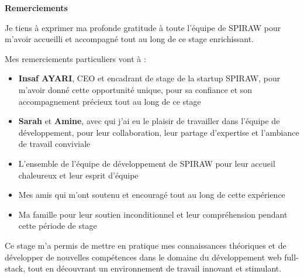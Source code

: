 \documentclass[12pt,a4paper]{article}
\begin{document}
\begin{center}
\vspace*{3cm}

{\Huge\bfseries Remerciements\par}

\vspace{2cm}

\begin{minipage}{0.8\textwidth}
Je tiens à exprimer ma profonde gratitude à toute l'équipe de SPIRAW pour m'avoir accueilli et accompagné tout au long de ce stage enrichissant. 

\vspace{1cm}

Mes remerciements particuliers vont à :
\begin{itemize}
    \item \textbf{Insaf AYARI}, CEO et encadrant de stage de la startup SPIRAW, pour m'avoir donné cette opportunité unique, pour sa confiance et son accompagnement précieux tout au long de ce stage
    \item \textbf{Sarah} et \textbf{Amine}, avec qui j'ai eu le plaisir de travailler dans l'équipe de développement, pour leur collaboration, leur partage d'expertise et l'ambiance de travail conviviale
    \item L'ensemble de l'équipe de développement de SPIRAW pour leur accueil chaleureux et leur esprit d'équipe
    \item Mes amis qui m'ont soutenu et encouragé tout au long de cette expérience
    \item Ma famille pour leur soutien inconditionnel et leur compréhension pendant cette période de stage
\end{itemize}

\vspace{1cm}

Ce stage m'a permis de mettre en pratique mes connaissances théoriques et de développer de nouvelles compétences dans le domaine du développement web full-stack, tout en découvrant un environnement de travail innovant et stimulant.
\end{minipage}
\end{center}

\newpage
\end{document}
